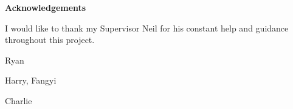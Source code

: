 \thispagestyle{empty}

\begin{center}
    {\LARGE\bf Acknowledgements}
\end{center}

I would like to thank my Supervisor Neil for his constant help and guidance throughout this project.

Ryan

Harry, Fangyi

Charlie
